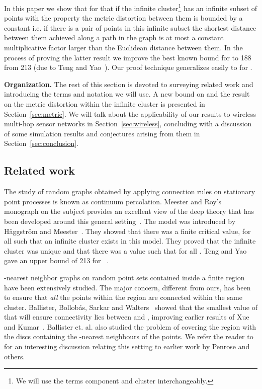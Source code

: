 \documentclass[11pt]{article}
\begin{document}
In this paper we show that for  that if  the
infinite cluster\footnote{We will use the terms component and cluster
interchangeably.} has an infinite subset of points with the property
the metric distortion between them is bounded by a constant i.e. if
there is a pair of points in this infinite subset the shortest
distance between them achieved along a path in the graph is at most a
constant multiplicative factor larger than the Euclidean distance
between them. In the process of proving the latter result we improve
the best known bound for  to 188 from 213 (due to Teng and
Yao~\cite{teng-algorithmica:2007}).  Our proof technique generalizes
easily to  for .  

{\bf Organization.} The rest of this section is devoted to surveying
related work and introducing the terms and notation we will use. A new
bound on  and the result on the metric distortion within the
infinite cluster is presented in Section~\ref{sec:metric}. We will
talk about the applicability of our results to wireless multi-hop
sensor networks in Section~\ref{sec:wireless}, concluding with a
discussion of some simulation results and conjectures arising from
them in Section~\ref{sec:conclusion}.

\subsection{Related work}
\label{sec:intro:related}

The study of random graphs obtained by applying connection rules on
stationary point processes is known as continuum percolation. Meester
and Roy's monograph on the subject provides an excellent view of the
deep theory that has been developed around this general
setting~\cite{meester:1996}. The  model was introduced by
H\"aggstr\"om and Meester~\cite{haggstrom-rsa:1996}. They showed that
there was a finite critical value,  for all  such
that an infinite cluster exists in this model. They proved that the
infinite cluster was unique and that there was a value  such that
 for all . Teng and Yao gave an upper bound of
213 for ~\cite{teng-algorithmica:2007}.

-nearest neighbor graphs on random point sets contained inside a
finite region have been extensively studied. The major concern,
different from ours, has been to ensure that {\em all} the points
within the region are connected within the same cluster. Ballister,
Bollob\'as, Sarkar and Walters~\cite{ballister-aap:2005} showed that
the smallest value of  that will ensure connectivity lies between
 and , improving earlier results of Xue
and Kumar~\cite{xue-wn:2004}. Ballister et. al. also studied the
problem of covering the region with the discs containing the
-nearest neighbours of the points. We refer the reader
to~\cite{ballister-aap:2005} for an interesting discussion relating
this setting to earlier work by Penrose and others.
\end{document}
